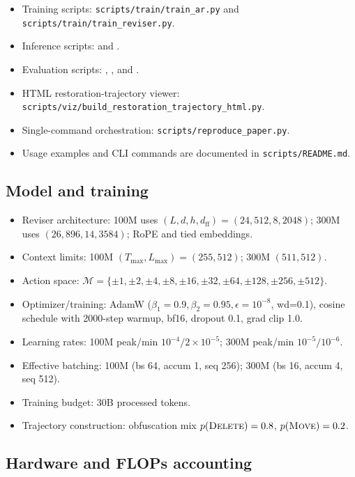 \documentclass[11pt]{article}
\DeclareRobustCommand{\Move}{\ifmmode\text{\textsc{Move}}\else\textsc{Move}\fi}
\DeclareRobustCommand{\Delete}{\ifmmode\text{\textsc{Delete}}\else\textsc{Delete}\fi}
\newcommand{\Mset}{\mathcal{M}}
\begin{document}
\begin{itemize}[leftmargin=*,itemsep=0.2em]
\item Training scripts: \texttt{scripts/train/train\_ar.py} and \texttt{scripts/train/train\_reviser.py}.
\item Inference scripts:  and .
\item Evaluation scripts: , , and .
\item HTML restoration-trajectory viewer: \texttt{scripts/viz/build\_restoration\_trajectory\_html.py}.
\item Single-command orchestration: \texttt{scripts/reproduce\_paper.py}.
\item Usage examples and CLI commands are documented in \texttt{scripts/README.md}.
\end{itemize}

\subsection{Model and training}
\label{sec:repro_hparams}

\begin{itemize}[leftmargin=*,itemsep=0.2em]
\item Reviser architecture: 100M uses $(L,d,h,d_{\text{ff}})=(24,512,8,2048)$; 300M uses $(26,896,14,3584)$; RoPE and tied embeddings.
\item Context limits: 100M $(T_{\max},L_{\max})=(255,512)$; 300M $(511,512)$.
\item Action space: $\Mset=\{\pm1,\pm2,\pm4,\pm8,\pm16,\pm32,\pm64,\pm128,\pm256,\pm512\}$.
\item Optimizer/training: AdamW ($\beta_1=0.9,\beta_2=0.95,\epsilon=10^{-8}$, wd=0.1), cosine schedule with 2000-step warmup, bf16, dropout 0.1, grad clip 1.0.
\item Learning rates: 100M peak/min $10^{-4}/2\times10^{-5}$; 300M peak/min $10^{-5}/10^{-6}$.
\item Effective batching: 100M (bs 64, accum 1, seq 256); 300M (bs 16, accum 4, seq 512).
\item Training budget: 30B processed tokens.
\item Trajectory construction: obfuscation mix $p(\Delete)=0.8$, $p(\Move)=0.2$.
\end{itemize}

\subsection{Hardware and FLOPs accounting}
\label{sec:repro_compute}
\end{document}
